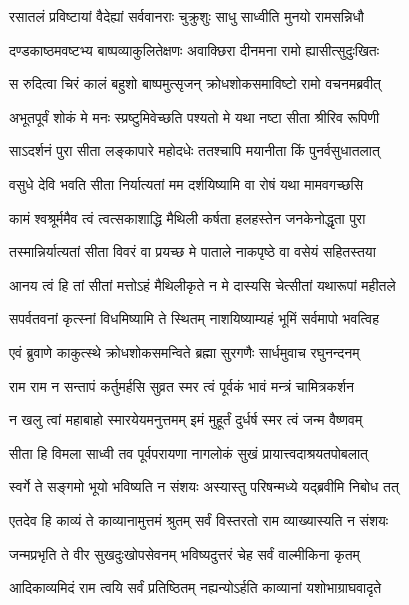 
\twolineshloka
{रसातलं प्रविष्टायां वैदेह्यां सर्ववानराः}
{चुक्रुशुः साधु साध्वीति मुनयो रामसन्निधौ} %

\twolineshloka
{दण्डकाष्ठमवष्टभ्य बाष्पव्याकुलितेक्षणः}
{अवाक्छिरा दीनमना रामो ह्यासीत्सुदुःखितः} %

\twolineshloka
{स रुदित्वा चिरं कालं बहुशो बाष्पमुत्सृजन्}
{क्रोधशोकसमाविष्टो रामो वचनमब्रवीत्} %

\twolineshloka
{अभूतपूर्वं शोकं मे मनः स्प्रष्टुमिवेच्छति}
{पश्यतो मे यथा नष्टा सीता श्रीरिव रूपिणी} %

\twolineshloka
{साऽदर्शनं पुरा सीता लङ्कापारे महोदधेः}
{ततश्चापि मयानीता किं पुनर्वसुधातलात्} %

\twolineshloka
{वसुधे देवि भवति सीता निर्यात्यतां मम}
{दर्शयिष्यामि वा रोषं यथा मामवगच्छसि} %

\twolineshloka
{कामं श्वश्रूर्ममैव त्वं त्वत्सकाशाद्धि मैथिली}
{कर्षता हलहस्तेन जनकेनोद्धृता पुरा} %

\twolineshloka
{तस्मान्निर्यात्यतां सीता विवरं वा प्रयच्छ मे}
{पाताले नाकपृष्ठे वा वसेयं सहितस्तया} %

\twolineshloka
{आनय त्वं हि तां सीतां मत्तोऽहं मैथिलीकृते}
{न मे दास्यसि चेत्सीतां यथारूपां महीतले} %

\twolineshloka
{सपर्वतवनां कृत्स्नां विधमिष्यामि ते स्थितम्}
{नाशयिष्याम्यहं भूमिं सर्वमापो भवत्विह} %

\twolineshloka
{एवं ब्रुवाणे काकुत्स्थे क्रोधशोकसमन्विते}
{ब्रह्मा सुरगणैः सार्धमुवाच रघुनन्दनम्} %

\twolineshloka
{राम राम न सन्तापं कर्तुमर्हसि सुव्रत}
{स्मर त्वं पूर्वकं भावं मन्त्रं चामित्रकर्शन} %

\twolineshloka
{न खलु त्वां महाबाहो स्मारयेयमनुत्तमम्}
{इमं मुहूर्तं दुर्धर्ष स्मर त्वं जन्म वैष्णवम्} %

\twolineshloka
{सीता हि विमला साध्वी तव पूर्वपरायणा}
{नागलोकं सुखं प्रायात्त्वदाश्रयतपोबलात्} %

\twolineshloka
{स्वर्गे ते सङ्गमो भूयो भविष्यति न संशयः}
{अस्यास्तु परिषन्मध्ये यद्ब्रवीमि निबोध तत्} %

\twolineshloka
{एतदेव हि काव्यं ते काव्यानामुत्तमं श्रुतम्}
{सर्वं विस्तरतो राम व्याख्यास्यति न संशयः} %

\twolineshloka
{जन्मप्रभृति ते वीर सुखदुःखोपसेवनम्}
{भविष्यदुत्तरं चेह सर्वं वाल्मीकिना कृतम्} %

\twolineshloka
{आदिकाव्यमिदं राम त्वयि सर्वं प्रतिष्ठितम्}
{नह्यन्योऽर्हति काव्यानां यशोभाग्राघवादृते} %

